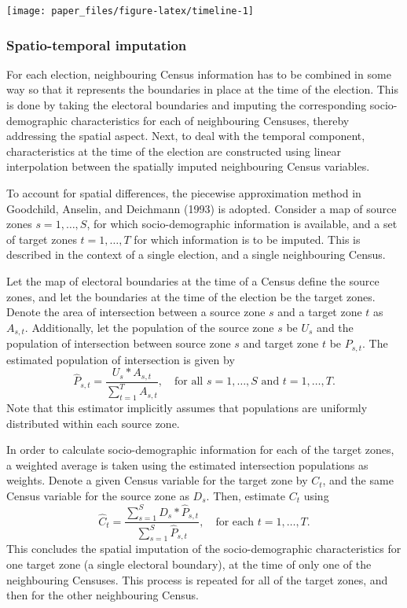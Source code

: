 \documentclass[times, doublespace]{anzsauth}
\let\origfigure\figure
\let\endorigfigure\endfigure
\renewenvironment{figure}[1][2] {
    \expandafter\origfigure\expandafter[htbp]
} {
    \endorigfigure
}
\begin{document}
\begin{figure}[h]

{\centering \texttt{[image: paper\_files/figure-latex/timeline-1]} 

}

\caption{Timeline of Australian elections and Censuses. They do not always occur in the same year.}\label{fig:timeline}
\end{figure}

\hypertarget{spatio-temporal-imputation}{%
\subsubsection{Spatio-temporal imputation}\label{spatio-temporal-imputation}}

For each election, neighbouring Census information has to be combined in some way so that it represents the boundaries in place at the time of the election. This is done by taking the electoral boundaries and imputing the corresponding socio-demographic characteristics for each of neighbouring Censuses, thereby addressing the spatial aspect. Next, to deal with the temporal component, characteristics at the time of the election are constructed using linear interpolation between the spatially imputed neighbouring Census variables.

To account for spatial differences, the piecewise approximation method in Goodchild, Anselin, and Deichmann (1993) is adopted. Consider a map of source zones \(s = 1,\dots,S\), for which socio-demographic information is available, and a set of target zones \(t = 1,\dots,T\) for which information is to be imputed. This is described in the context of a single election, and a single neighbouring Census.

Let the map of electoral boundaries at the time of a Census define the source zones, and let the boundaries at the time of the election be the target zones. Denote the area of intersection between a source zone \(s\) and a target zone \(t\) as \(A_{s,t}\). Additionally, let the population of the source zone \(s\) be \(U_s\) and the population of intersection between source zone \(s\) and target zone \(t\) be \(P_{s,t}\). The estimated population of intersection is given by
\[
  \hat{P}_{s,t} = \frac{U_s*A_{s,t}}{\sum_{t=1}^T A_{s,t}},
  \quad\text{for all $s=1,\dots,S$ and $t=1,\dots,T$}.
\]
Note that this estimator implicitly assumes that populations are uniformly distributed within each source zone.

In order to calculate socio-demographic information for each of the target zones, a weighted average is taken using the estimated intersection populations as weights. Denote a given Census variable for the target zone by \(C_t\), and the same Census variable for the source zone as \(D_s\). Then, estimate \(C_t\) using
\[
  \hat{C}_t = \frac{\sum_{s=1}^{S}{D_s*\hat{P}_{s,t}}}%
  {\sum_{s=1}^{S}{\hat{P}_{s,t}}},
  \quad\text{for each $t=1,\dots,T$}.
\]
This concludes the spatial imputation of the socio-demographic characteristics for one target zone (a single electoral boundary), at the time of only one of the neighbouring Censuses. This process is repeated for all of the target zones, and then for the other neighbouring Census.
\end{document}
